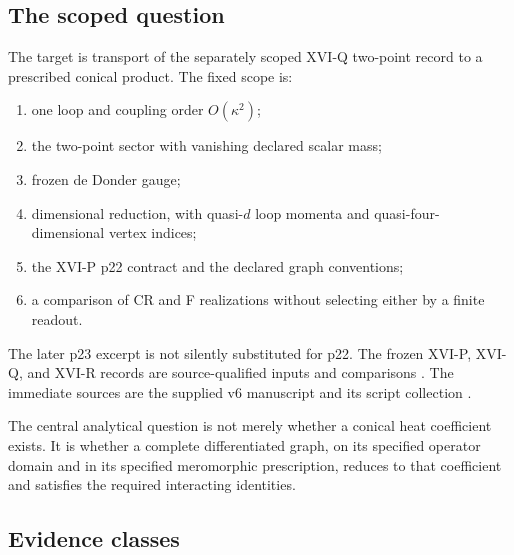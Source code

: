 \documentclass[11pt,a4paper]{article}
\newcommand{\ka}{\kappa}
\theoremstyle{plain}
\theoremstyle{definition}
\theoremstyle{remark}
\numberwithin{equation}{section}
\begin{document}
\subsection{The scoped question}

The target is transport of the separately scoped XVI-Q two-point
record to a prescribed conical product. The fixed scope is:
\begin{enumerate}[label=\textup{(\roman*)}]
\item one loop and coupling order \(O(\ka^2)\);
\item the two-point sector with vanishing declared scalar mass;
\item frozen de Donder gauge;
\item dimensional reduction, with quasi-\(d\) loop momenta and
quasi-four-dimensional vertex indices;
\item the XVI-P p22 contract and the declared graph conventions;
\item a comparison of CR and F realizations without selecting
either by a finite readout.
\end{enumerate}
The later p23 excerpt is not silently substituted for p22.
The frozen XVI-P, XVI-Q, and XVI-R records are source-qualified
inputs and comparisons \cite{CheungP,CheungQ,CheungR}.
The immediate sources are the supplied v6 manuscript and its
script collection \cite{CheungConeV6,CheungConeScripts}.

The central analytical question is not merely whether a conical
heat coefficient exists. It is whether a complete differentiated
graph, on its specified operator domain and in its specified
meromorphic prescription, reduces to that coefficient and
satisfies the required interacting identities.

\subsection{Evidence classes}
\end{document}
